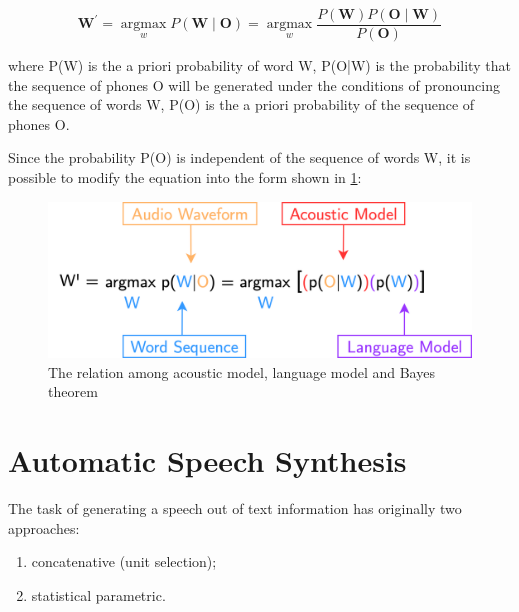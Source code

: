 \begin{equation}
    \boldsymbol{W}^{\prime}=\underset{w}{\operatorname{argmax}} P(\boldsymbol{W} \mid \boldsymbol{O})=\underset{w}{\operatorname{argmax}} \frac{P(\boldsymbol{W}) P(\boldsymbol{O} \mid \boldsymbol{W})}{P(\boldsymbol{O})}
\end{equation}




where P(W) is the a priori probability of word W, P(O|W) is the probability that the sequence of phones O will be generated under the conditions of pronouncing the sequence of words W, P(O) is the a priori probability of the sequence of phones O. 

Since the probability P(O) is independent of the sequence of words W, it is possible to modify the equation into the form shown in \cref{fig:bayes}:


\begin{figure}[H]
	\centering
	\includegraphics[width=\textwidth]{img/asr_bayes.png}
	\caption{The relation among acoustic model, language model and Bayes theorem}
	\label{fig:bayes}
\end{figure}

\section{Automatic Speech Synthesis}

The task of generating a speech out of text information has originally two approaches:
\begin{enumerate}
    \item concatenative (unit selection);
    \item statistical parametric.
\end{enumerate}

